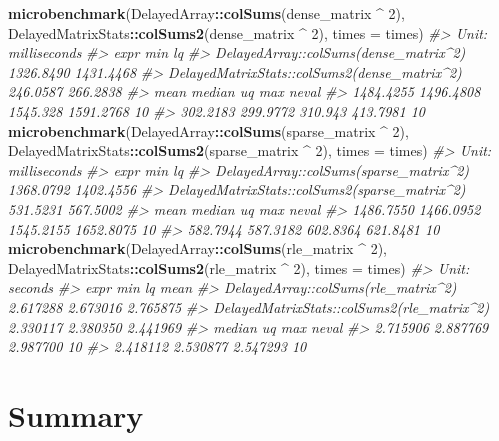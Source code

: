 \documentclass[]{book}
\newenvironment{Shaded}{\begin{snugshade}}{\end{snugshade}}
\newcommand{\KeywordTok}[1]{\textcolor[rgb]{0.13,0.29,0.53}{\textbf{#1}}}
\newcommand{\DataTypeTok}[1]{\textcolor[rgb]{0.13,0.29,0.53}{#1}}
\newcommand{\DecValTok}[1]{\textcolor[rgb]{0.00,0.00,0.81}{#1}}
\newcommand{\StringTok}[1]{\textcolor[rgb]{0.31,0.60,0.02}{#1}}
\newcommand{\CommentTok}[1]{\textcolor[rgb]{0.56,0.35,0.01}{\textit{#1}}}
\newcommand{\OperatorTok}[1]{\textcolor[rgb]{0.81,0.36,0.00}{\textbf{#1}}}
\newcommand{\NormalTok}[1]{#1}
\begin{document}
\begin{Shaded}
\begin{Highlighting}[]
\KeywordTok{microbenchmark}\NormalTok{(DelayedArray}\OperatorTok{::}\KeywordTok{colSums}\NormalTok{(dense_matrix }\OperatorTok{^}\StringTok{ }\DecValTok{2}\NormalTok{),}
\NormalTok{               DelayedMatrixStats}\OperatorTok{::}\KeywordTok{colSums2}\NormalTok{(dense_matrix }\OperatorTok{^}\StringTok{ }\DecValTok{2}\NormalTok{),}
               \DataTypeTok{times =}\NormalTok{ times)}
\CommentTok{#> Unit: milliseconds}
\CommentTok{#>                                          expr       min        lq}
\CommentTok{#>         DelayedArray::colSums(dense_matrix^2) 1326.8490 1431.4468}
\CommentTok{#>  DelayedMatrixStats::colSums2(dense_matrix^2)  246.0587  266.2838}
\CommentTok{#>       mean    median       uq       max neval}
\CommentTok{#>  1484.4255 1496.4808 1545.328 1591.2768    10}
\CommentTok{#>   302.2183  299.9772  310.943  413.7981    10}
\KeywordTok{microbenchmark}\NormalTok{(DelayedArray}\OperatorTok{::}\KeywordTok{colSums}\NormalTok{(sparse_matrix }\OperatorTok{^}\StringTok{ }\DecValTok{2}\NormalTok{),}
\NormalTok{               DelayedMatrixStats}\OperatorTok{::}\KeywordTok{colSums2}\NormalTok{(sparse_matrix }\OperatorTok{^}\StringTok{ }\DecValTok{2}\NormalTok{),}
               \DataTypeTok{times =}\NormalTok{ times)}
\CommentTok{#> Unit: milliseconds}
\CommentTok{#>                                           expr       min        lq}
\CommentTok{#>         DelayedArray::colSums(sparse_matrix^2) 1368.0792 1402.4556}
\CommentTok{#>  DelayedMatrixStats::colSums2(sparse_matrix^2)  531.5231  567.5002}
\CommentTok{#>       mean    median        uq       max neval}
\CommentTok{#>  1486.7550 1466.0952 1545.2155 1652.8075    10}
\CommentTok{#>   582.7944  587.3182  602.8364  621.8481    10}
\KeywordTok{microbenchmark}\NormalTok{(DelayedArray}\OperatorTok{::}\KeywordTok{colSums}\NormalTok{(rle_matrix }\OperatorTok{^}\StringTok{ }\DecValTok{2}\NormalTok{),}
\NormalTok{               DelayedMatrixStats}\OperatorTok{::}\KeywordTok{colSums2}\NormalTok{(rle_matrix }\OperatorTok{^}\StringTok{ }\DecValTok{2}\NormalTok{),}
               \DataTypeTok{times =}\NormalTok{ times)}
\CommentTok{#> Unit: seconds}
\CommentTok{#>                                        expr      min       lq     mean}
\CommentTok{#>         DelayedArray::colSums(rle_matrix^2) 2.617288 2.673016 2.765875}
\CommentTok{#>  DelayedMatrixStats::colSums2(rle_matrix^2) 2.330117 2.380350 2.441969}
\CommentTok{#>    median       uq      max neval}
\CommentTok{#>  2.715906 2.887769 2.987700    10}
\CommentTok{#>  2.418112 2.530877 2.547293    10}
\end{Highlighting}
\end{Shaded}

\section{Summary}\label{summary}


\end{document}
